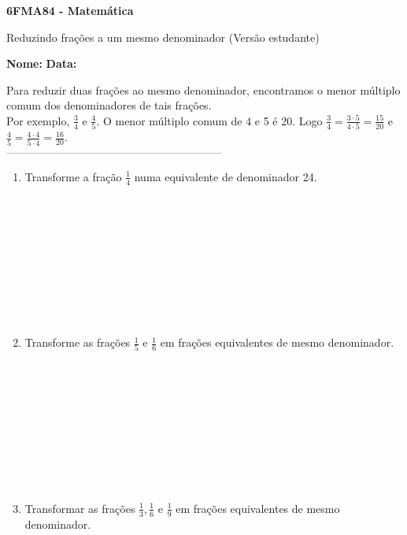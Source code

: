 \documentclass[a4paper,14pt]{article}
\begin{document}
	
	\noindent\textbf{6FMA84 - Matemática} 
	
	\begin{center}Reduzindo frações a um mesmo denominador (Versão estudante)
	\end{center}
	
	\noindent\textbf{Nome:} \underline{\hspace{10cm}}
	\noindent\textbf{Data:} \underline{\hspace{4cm}}
	
	
	\begin{multicols}{2}
		\noindent Para reduzir duas frações ao mesmo denominador, encontramos o menor múltiplo comum dos denominadores de tais frações. \\
		Por exemplo, $\frac{3}{4}$ e $\frac{4}{5}$. O menor múltiplo comum de 4 e 5 é 20. Logo $\frac{3}{4} = \frac{3 \cdot 5}{4 \cdot 5} = \frac{15}{20}$ e $\frac{4}{5} = \frac{4 \cdot 4}{5 \cdot 4} = \frac{16}{20}$. \\
		\noindent\textsubscript{-----------------------------------------------------------------------}
		\begin{enumerate} 
			\item Transforme a fração $\frac{1}{4}$ numa equivalente de denominador 24. \\\\\\\\\\\\\\\\\\\\
			\item Transforme as frações $\frac{1}{5}$ e $\frac{1}{6}$ em frações equivalentes de mesmo denominador. \\\\\\\\\\\\\\\\\\\\
			\item Transformar as frações $\frac{1}{3}, \frac{1}{6}$ e $\frac{1}{9}$ em frações equivalentes de mesmo denominador. \\\\\\\\\\\\\\\\\\\\

\end{enumerate}
\end{multicols}
\end{document}
